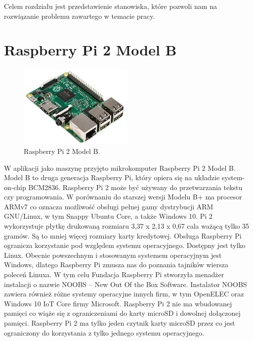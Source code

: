 Celem rozdziału jest przedstawienie stanowiska, które pozwoli nam na rozwiązanie problemu zawartego w temacie pracy.
\section{Raspberry Pi 2 Model B} 
\begin{figure}[htbp]
	\centering
	\includegraphics[width=0.7\linewidth]{"obrazy/Raspberry Pi"}
	\caption{Raspberry Pi 2 Model B.}
	\label{fig:1}
\end{figure}
W aplikacji jako maszynę przyjęto mikrokomputer Raspberry Pi 2 Model B. Model B to druga generacja Raspberry Pi, który opiera się na układzie system-on-chip BCM2836. Raspberry Pi 2 może być używany do przetwarzania tekstu czy programowania. W porównaniu do starszej wersji Modelu B+ ma procesor ARMv7 co oznacza możliwość obsługi pełnej gamy dystrybucji ARM GNU/Linux,  w tym Snappy Ubuntu Core, a także Windows 10. Pi 2 wykorzystuje płytkę drukowaną rozmiaru 3,37 x 2,13 x 0,67 cala ważącą tylko 35 gramów. Są to mniej więcej rozmiary karty kredytowej.
Obsługa Raspberry Pi ogranicza korzystanie pod względem systemu operacyjnego. Dostępny jest tylko Linux. Obecnie powszechnym i stosowanym systemem operacyjnym jest Windows, dlatego Raspberry Pi zmusza nas do poznania tajników wiersza poleceń Linuxa. W tym celu Fundacja Raspberry Pi stworzyła menadżer instalacji o nazwie NOOBS – New Out Of the Box Software. Instalator NOOBS zawiera również różne systemy operacyjne innych firm, w tym OpenELEC oraz Windows 10 IoT Core firmy Microsoft. Raspberry Pi 2 nie ma wbudowanej pamięci co wiąże się z ograniczeniami do karty microSD i dowolnej dołączonej pamięci. Raspberry Pi 2 ma tylko jeden czytnik karty microSD przez co jest ograniczony do korzystania z tylko jednego systemu operacyjnego.

